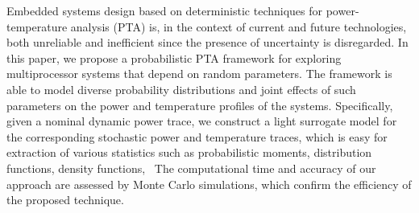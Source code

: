 Embedded systems design based on deterministic techniques for power-temperature analysis (PTA) is, in the context of current and future technologies, both unreliable and inefficient since the presence of uncertainty is disregarded. In this paper, we propose a probabilistic PTA framework for exploring multiprocessor systems that depend on random parameters. The framework is able to model diverse probability distributions and joint effects of such parameters on the power and temperature profiles of the systems. Specifically, given a nominal dynamic power trace, we construct a light surrogate model for the corresponding stochastic power and temperature traces, which is easy for extraction of various statistics such as probabilistic moments, distribution functions, density functions, \etc\ The computational time and accuracy of our approach are assessed by Monte Carlo simulations, which confirm the efficiency of the proposed technique.
